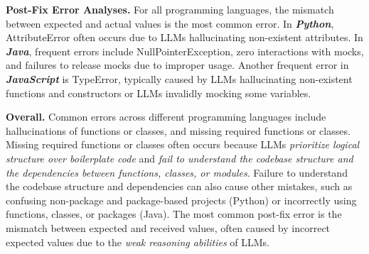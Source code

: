 \noindent\textbf{Post-Fix Error Analyses. }
For all programming languages, the mismatch between expected and actual values is the most common error.
In \textbf{\textit{Python}}, AttributeError often occurs due to LLMs hallucinating non-existent attributes.
In \textbf{\textit{Java}}, frequent errors include NullPointerException, zero interactions with mocks, and failures to release mocks due to improper usage.
Another frequent error in \textbf{\textit{JavaScript}} is TypeError, typically caused by LLMs hallucinating non-existent functions and constructors or LLMs invalidly mocking some variables.

\noindent\textbf{Overall. }
Common errors across different programming languages include hallucinations of functions or classes, and missing required functions or classes. 
Missing required functions or classes often occurs because LLMs \textit{prioritize logical structure over boilerplate code} and \textit{fail to understand the codebase structure and the dependencies between functions, classes, or modules}. Failure to understand the codebase structure and dependencies can also cause other mistakes, such as confusing non-package and package-based projects (Python) or incorrectly using functions, classes, or packages (Java).
The most common post-fix error is the mismatch between expected and received values, often caused by incorrect expected values due to the \textit{weak reasoning abilities} of LLMs.

